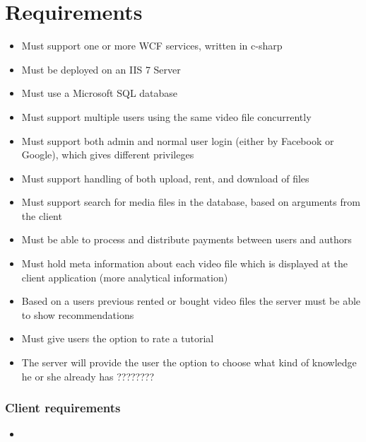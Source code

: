 \section{Requirements}
\begin{itemize}
\item Must support one or more WCF services, written in c-sharp
\item Must be deployed on an IIS 7 Server
\item Must use a Microsoft SQL database
\item Must support multiple users using the same video file concurrently
\item Must support both admin and normal user login (either by Facebook or Google), which gives different privileges
\item Must support handling of both upload, rent, and download of files
\item Must support search for media files in the database, based on arguments from the client
\item Must be able to process and distribute payments between users and authors
\item Must hold meta information about each video file which is displayed at the client application (more analytical information)
\item Based on a users previous rented or bought video files the server must be able to show recommendations
\item Must give users the option to rate a tutorial
\item The server will provide the user the option to choose what kind of knowledge he or she already has ????????
\end{itemize}

\subsubsection{Client requirements}
\begin{itemize}
	\item
\end{itemize}
